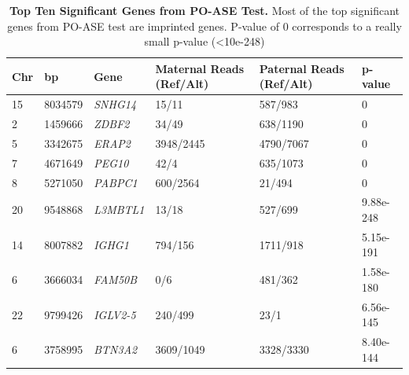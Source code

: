 \begin{table}[!htb]
\centering
\begin{adjustbox}{width={\textwidth}}
\begin{tabular}{@{}p{1cm}p{3cm}p{3cm}p{5cm}p{5cm}p{3cm}@{}}
 \toprule  Chr & bp & Gene & Maternal Reads (Ref/Alt) & Paternal Reads (Ref/Alt) & p-value \\ \midrule
15 & 8034579 & \emph{SNHG14} & 15/11  & 587/983 & 0 \\
2 & 1459666  & \emph{ZDBF2} & 34/49  & 638/1190 & 0\\
5 & 3342675 & \emph{ERAP2} & 3948/2445 & 4790/7067 & 0\\
7 & 4671649 &  \emph{PEG10} & 42/4  & 635/1073 & 0 \\
8 & 5271050 & \emph{PABPC1} & 600/2564 & 21/494 & 0 \\
20 & 9548868 & \emph{L3MBTL1} & 13/18 & 527/699 & 9.88e-248 \\
14 & 8007882 & \emph{IGHG1} &   794/156  & 1711/918 & 5.15e-191\\
6 & 3666034 & \emph{FAM50B} & 0/6 & 481/362 & 1.58e-180\\
22 & 9799426 & \emph{IGLV2-5} & 240/499 & 23/1 & 6.56e-145\\
6 & 3758995 & \emph{BTN3A2} & 3609/1049  & 3328/3330 &  8.40e-144\\  \bottomrule
\end{tabular}
\end{adjustbox}
\caption[Top Ten Significant Genes from PO-ASE Test.]{\textbf{Top Ten Significant Genes from PO-ASE Test.} Most of the top significant genes from PO-ASE test are imprinted genes. P-value of 0 corresponds to a really small p-value (\textless 10e-248)}
\label{tab:poase1}
\end{table}


